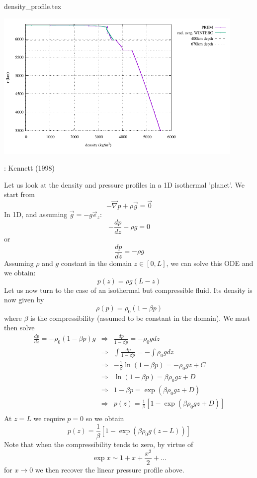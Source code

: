 \begin{flushright} {\tiny {\color{gray} density\_profile.tex}} \end{flushright}

\begin{center}
\includegraphics[width=12cm]{images/density_profile/density_profile}
\end{center}

\Literature: Kennett (1998) \cite{kenn98}

Let us look at the density and pressure profiles in a 1D isothermal 'planet'. 
We start from 
\[
-\vec\nabla p + \rho \vec{g} = \vec{0}
\]
In 1D, and assuming $\vec{g}=-g \vec{e}_z$:
\[
-\frac{dp}{dz}-\rho g=0
\]
or
\[
\frac{dp}{dz}= -\rho g
\]
Assuming $\rho$ and $g$ constant in the domain $z\in [0,L]$, we can solve this ODE and we obtain:
\[
p(z) = \rho g (L-z)
\]
Let us now turn to the case of an isothermal but compressible fluid. 
Its density is now given by 
\[
\rho(p) = \rho_0(1-\beta p)
\]
where $\beta$ is the compressibility (assumed to be constant in the domain). We must then solve
\begin{eqnarray}
\frac{dp}{dz}= -\rho_0(1-\beta p) g
&\Rightarrow&
\frac{dp}{1-\beta p} = -\rho_0 g dz \nonumber\\
&\Rightarrow&
\int \frac{dp}{1-\beta p} = -\int \rho_0 g dz \nonumber\\
&\Rightarrow&
-\frac{1}{\beta} \ln (1-\beta p) = -\rho_0 g z + C \nonumber\\
&\Rightarrow&
\ln (1-\beta p) = \beta \rho_0 g z + D \nonumber\\
&\Rightarrow&
1 -\beta p = \exp \left( \beta \rho_0 g z + D  \right) \nonumber\\
&\Rightarrow&
p(z) = \frac{1}{\beta} \left[ 1- \exp \left( \beta \rho_0 g z + D  \right) \right] \nonumber\\
\end{eqnarray}
At $z=L$ we require $p=0$ so we obtain
\[
p(z) = \frac{1}{\beta} \left[ 1- \exp \left( \beta \rho_0 g (z-L)  \right) \right]
\]
Note that when the compressibility tends to zero, by virtue of 
\[
\exp x \sim 1 + x + \frac{x^2}{2} + ...
\]
for $x\rightarrow 0$ we then recover the linear pressure profile above.

